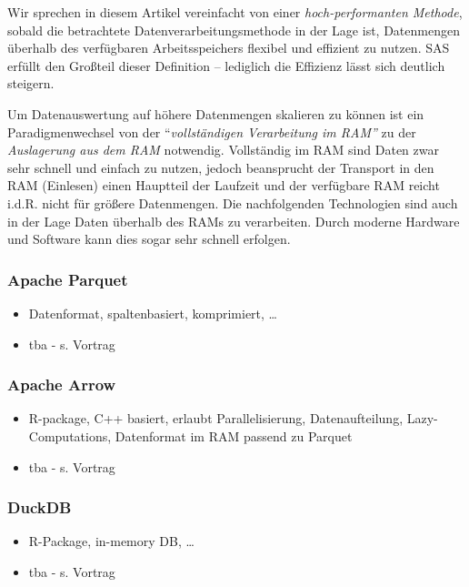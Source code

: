 \documentclass[
  german,
  10pt,
  twoside]{article}
\providecommand{\tightlist}{%
  \setlength{\itemsep}{0pt}\setlength{\parskip}{0pt}}
\begin{document}
Wir sprechen in diesem Artikel vereinfacht von einer
\emph{hoch-performanten Methode}, sobald die betrachtete
Datenverarbeitungsmethode in der Lage ist, Datenmengen überhalb des
verfügbaren Arbeitsspeichers flexibel und effizient zu nutzen. SAS
erfüllt den Großteil dieser Definition -- lediglich die Effizienz lässt
sich deutlich steigern.

Um Datenauswertung auf höhere Datenmengen skalieren zu können ist ein
Paradigmenwechsel von der ``\emph{vollständigen Verarbeitung im RAM''}
zu der \emph{Auslagerung aus dem RAM} notwendig. Vollständig im RAM sind
Daten zwar sehr schnell und einfach zu nutzen, jedoch beansprucht der
Transport in den RAM (Einlesen) einen Hauptteil der Laufzeit und der
verfügbare RAM reicht i.d.R. nicht für größere Datenmengen. Die
nachfolgenden Technologien sind auch in der Lage Daten überhalb des RAMs
zu verarbeiten. Durch moderne Hardware und Software kann dies sogar sehr
schnell erfolgen.

\subsubsection{Apache Parquet}\label{apache-parquet}

\begin{itemize}
\tightlist
\item
  Datenformat, spaltenbasiert, komprimiert, \ldots{}
\item
  tba - s. Vortrag
\end{itemize}

\subsubsection{Apache Arrow}\label{apache-arrow}

\begin{itemize}
\tightlist
\item
  R-package, C++ basiert, erlaubt Parallelisierung, Datenaufteilung,
  Lazy-Computations, Datenformat im RAM passend zu Parquet
\item
  tba - s. Vortrag
\end{itemize}

\subsubsection{DuckDB}\label{duckdb}

\begin{itemize}
\tightlist
\item
  R-Package, in-memory DB, \ldots{}
\item
  tba - s. Vortrag
\end{itemize}
\end{document}
